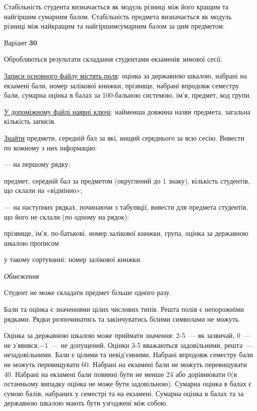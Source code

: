 \documentclass[11pt, ukrainian]{article}
\begin{document}
Стабільність студента визначається як модуль різниці між його кращим та найгіршим сумарним балом.
Стабільність предмета визначається як модуль різниці між найкращим та найгіршимсумарним балом за цим предметом.




\par
\newpage
{\center Варіант  \No \textbf { 30 }\par}
\bigskip
Обробляються результати складання студентами екзаменів зимової сесії.

\underline{Записи основного файлу містять поля}: оцінка за державною шкалою, набрані на екзамені бали, номер залікової книжки, прізвище, набрані впродовж семестру бали, сумарна оцінка в балах за 100-бальною системою, ім’я, предмет, код групи.

\underline{У допоміжному файлі наявні ключі}: найменша довжина назви предмета, загальна кількість записів.

\underline{Знайти} предмети, середній бал за які, вищий середнього за всю сесію. Вивести по кожному з них інформацію:\par
{\noindent}--- на першому рядку:\par
предмет, середній бал за предметом (округлений до 1 знаку), кількість студентів, що склали на «відмінно»;

{\noindent}--- на наступних рядках, починаючи з табуляції, вивести для предмета студентів, що його не склали (по одному на рядок):\par
прізвище, ім’я, по-батькові, номер залікової книжки, група, оцінка за державною шкалою прописом

{\noindent}у такому сортуванні: номер залікової книжки.


\bigskip\textit{Обмеження}

Студент не може складати предмет більше одного разу.

Бали та оцінка є значеннями цілих числових типів. Решта полів є непорожніми рядками.
Рядки розпочинатись та закінчуватись білими символами не можуть.

Оцінка за державною шкалою може приймати значення: 2-5~--- як зазвичай, 0~--- не з’явився,$-1$~--- не допущений. 
Оцінки 3-5 вважаються задовільними, решта~--- незадовільними. 
Бали є цілими та невід’ємними.
Набрані впродовж семестру бали не можуть перевищувати 60. 
Набрані на екзамені бали не можуть перевищувати 40. 
Набрані на екзамені бали повинні бути не менше 24 або дорівнювати 0(в останньому випадку оцінка не може бути задовільною). 
Сумарна оцінка в балах є сумою балів, набраних у семестрі та на екзамені.
Сумарна оцінка в балах та за державною шкалою мають бути узгоджені між собою.
\end{document}
